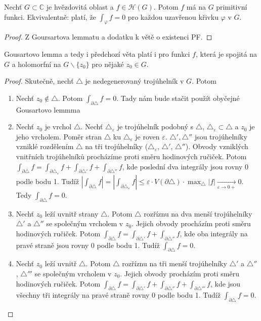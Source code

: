 \begin{theorem}
Nechť $G \subset \mathbb{C}$ je hvězdovitá oblast a  $f \in \mathcal{H}(G)$. Potom $f$ má na $G$ primitivní funkci. Ekvivalentně: platí, že $\int_\varphi f=0$ pro každou uzavřenou křivku $\varphi$ v $G$.
\end{theorem}

\begin{proof}
Z Goursartova lemmatu a dodatku k větě o existenci PF.
\end{proof}

\begin{note} %
Gousartovo lemma a tedy i předchozí věta platí i pro funkci $f$, která je spojitá na $G$ a holomorfní na $G \backslash \{z_0\}$ pro nějaké $z_0 \in G$.
\end{note}

\begin{proof}
Skutečně, nechť $\triangle$ je nedegenerovaný trojúhelník v $G$. Potom
\begin{enumerate}
    \item Nechť $z_0 \notin \triangle$. Potom $\int_{\partial\triangle}f=0$. Tady nám bude stačit použít obyčejné Gousartovo lemmma
    \item Nechť $z_0$ je vrchol $\triangle$. Nechť $\triangle_\varepsilon$ je trojúhelník podobný s $\triangle$, $\triangle_\varepsilon\subset \triangle$
    a
    $z_{0}$ je jeho
    vrcholem. Poměr stran $\triangle$ ku 
    $\triangle_\varepsilon$ je
    roven $\varepsilon$. $\triangle', \triangle''$ jsou trojúhelníky vzniklé rozdělením $\triangle$ na tři trojúhelníky ($\triangle_\varepsilon$, $\triangle'$, $\triangle''$). Obvody vzniklých vnitřních trojúhelníků procházíme proti směru hodinových ručiček.
    Potom $\int_{\partial\triangle}f=\int_{\partial\triangle_\varepsilon}f+\int_{\partial\triangle'}f+\int_{\partial\triangle''}f$, kde poslední dva integrály jsou rovny $0$ podle bodu 1. Tudíž $|\int_{\partial\triangle}f|=|\int_{\partial\triangle_\varepsilon}f| \le \varepsilon \cdot V(\partial\triangle) \cdot \max_\triangle |f| \xrightarrow[\varepsilon \rightarrow 0+]{}0$. Tedy  $\int_{\partial\triangle} f=0$.
    \item Nechť $z_0$ leží uvnitř strany $\triangle$. Potom $\triangle$ rozříznu na dva menší trojúhelníky $\triangle'$ a $\triangle''$ se společným vrcholem v $z_{0}$. Jejich obvody procházím proti směru hodinových ručiček. Potom $\int_{\partial\triangle}f=\int_{\partial\triangle'}f+\int_{\partial\triangle''}f$, kde oba integrály na pravé straně jsou rovny $0$ podle bodu 1. Tudíž $\int_{\partial\triangle}f=0$.
    \item Nechť $z_0$ leží uvnitř $\triangle$. Potom $\triangle$ rozříznu na tři menší trojúhelníky $\triangle'$ a $\triangle''$, $\triangle'''$ se společným vrcholem v $z_{0}$. Jejich obvody procházím proti směru hodinových ručiček. Potom $\int_{\partial\triangle}f=\int_{\partial\triangle'}f+\int_{\partial\triangle''}f+\int_{\partial\triangle'''}f$, kde jsou všechny tři integrály na pravé straně rovny $0$ podle bodu 1. Tudíž $\int_{\partial\triangle}f=0$.
\end{enumerate}
\end{proof}

